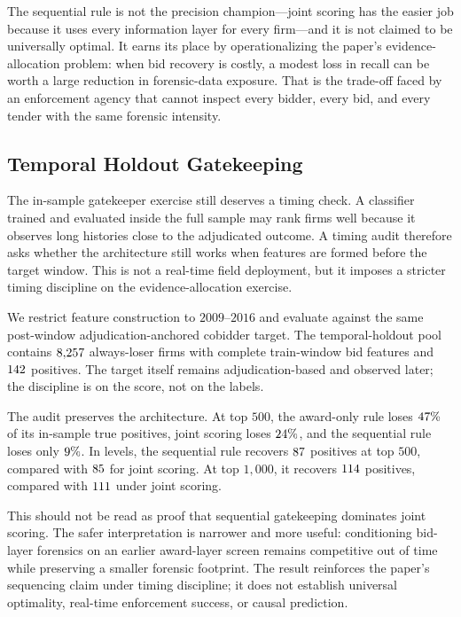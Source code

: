 The sequential rule is not the precision champion---joint
scoring has the easier job because it uses every information
layer for every firm---and it is not claimed to be universally
optimal. It earns its place by operationalizing the paper's
evidence-allocation problem: when bid recovery is costly, a
modest loss in recall can be worth a large reduction in
forensic-data exposure. That is the trade-off faced by an
enforcement agency that cannot inspect every bidder, every bid,
and every tender with the same forensic intensity.

\subsection{Temporal Holdout Gatekeeping}
\label{sec:temporal_gatekeeper}

The in-sample gatekeeper exercise still deserves a timing
check. A classifier trained and evaluated inside the full
sample may rank firms well because it observes long histories
close to the adjudicated outcome. A timing audit therefore asks
whether the architecture still works when features are formed
before the target window. This is not a real-time field
deployment, but it imposes a stricter timing discipline on the
evidence-allocation exercise.

We restrict feature construction to $2009$--$2016$ and evaluate
against the same post-window adjudication-anchored cobidder
target. The temporal-holdout pool contains
$8{,}257$ always-loser firms with complete
train-window bid features and $142$ positives. The
target itself remains adjudication-based and observed later;
the discipline is on the score, not on the labels.

The audit preserves the architecture. At top $500$, the
award-only rule loses $47\%$ of its in-sample true
positives, joint scoring loses $24\%$, and the
sequential rule loses only $9\%$. In levels, the
sequential rule recovers $87$ positives
at top $500$, compared with $85$ for
joint scoring. At top $1{,}000$, it recovers
$114$ positives, compared with
$111$ under joint scoring.

This should not be read as proof that sequential gatekeeping
dominates joint scoring. The safer interpretation is narrower
and more useful: conditioning bid-layer forensics on an earlier
award-layer screen remains competitive out of time while
preserving a smaller forensic footprint. The result reinforces
the paper's sequencing claim under timing discipline; it does
not establish universal optimality, real-time enforcement
success, or causal prediction.

